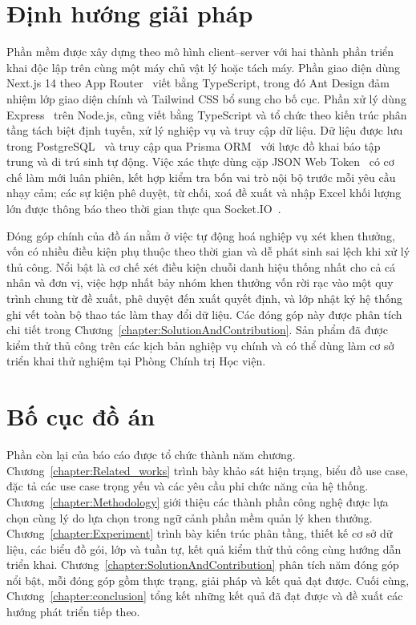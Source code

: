 \documentclass[../DoAn.tex]{subfiles}
\begin{document}
\section{Định hướng giải pháp}
\label{section:1.3}

Phần mềm được xây dựng theo mô hình client--server với hai thành phần triển khai độc lập trên cùng một máy chủ vật lý hoặc tách máy. Phần giao diện dùng Next.js 14 theo App Router~\cite{nextjsdocs} viết bằng TypeScript, trong đó Ant Design đảm nhiệm lớp giao diện chính và Tailwind CSS bổ sung cho bố cục. Phần xử lý dùng Express~\cite{expressdocs} trên Node.js, cũng viết bằng TypeScript và tổ chức theo kiến trúc phân tầng tách biệt định tuyến, xử lý nghiệp vụ và truy cập dữ liệu. Dữ liệu được lưu trong PostgreSQL~\cite{pgdocs} và truy cập qua Prisma ORM~\cite{prismadocs} với lược đồ khai báo tập trung và di trú sinh tự động. Việc xác thực dùng cặp JSON Web Token~\cite{rfc7519} có cơ chế làm mới luân phiên, kết hợp kiểm tra bốn vai trò nội bộ trước mỗi yêu cầu nhạy cảm; các sự kiện phê duyệt, từ chối, xoá đề xuất và nhập Excel khối lượng lớn được thông báo theo thời gian thực qua Socket.IO~\cite{socketiodocs}.

Đóng góp chính của đồ án nằm ở việc tự động hoá nghiệp vụ xét khen thưởng, vốn có nhiều điều kiện phụ thuộc theo thời gian và dễ phát sinh sai lệch khi xử lý thủ công. Nổi bật là cơ chế xét điều kiện chuỗi danh hiệu thống nhất cho cả cá nhân và đơn vị, việc hợp nhất bảy nhóm khen thưởng vốn rời rạc vào một quy trình chung từ đề xuất, phê duyệt đến xuất quyết định, và lớp nhật ký hệ thống ghi vết toàn bộ thao tác làm thay đổi dữ liệu. Các đóng góp này được phân tích chi tiết trong Chương~\ref{chapter:SolutionAndContribution}. Sản phẩm đã được kiểm thử thủ công trên các kịch bản nghiệp vụ chính và có thể dùng làm cơ sở triển khai thử nghiệm tại Phòng Chính trị Học viện.

\section{Bố cục đồ án}
\label{section:1.4}

Phần còn lại của báo cáo được tổ chức thành năm chương. Chương~\ref{chapter:Related_works} trình bày khảo sát hiện trạng, biểu đồ use case, đặc tả các use case trọng yếu và các yêu cầu phi chức năng của hệ thống. Chương~\ref{chapter:Methodology} giới thiệu các thành phần công nghệ được lựa chọn cùng lý do lựa chọn trong ngữ cảnh phần mềm quản lý khen thưởng. Chương~\ref{chapter:Experiment} trình bày kiến trúc phân tầng, thiết kế cơ sở dữ liệu, các biểu đồ gói, lớp và tuần tự, kết quả kiểm thử thủ công cùng hướng dẫn triển khai. Chương~\ref{chapter:SolutionAndContribution} phân tích năm đóng góp nổi bật, mỗi đóng góp gồm thực trạng, giải pháp và kết quả đạt được. Cuối cùng, Chương~\ref{chapter:conclusion} tổng kết những kết quả đã đạt được và đề xuất các hướng phát triển tiếp theo.
\end{document}
